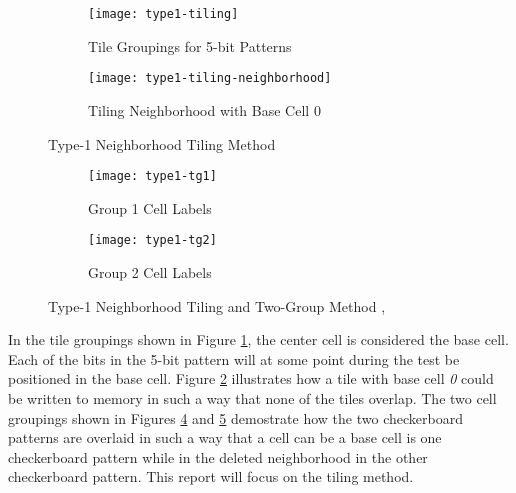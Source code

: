 \begin{figure}[H]
  \centering
  \begin{subfigure}[b]{0.4\textwidth}
    \texttt{[image: type1-tiling]}
    \caption{Tile Groupings for 5-bit Patterns}
    \label{fig:type1-tl}
  \end{subfigure}
  \begin{subfigure}[b]{0.4\textwidth}
    \texttt{[image: type1-tiling-neighborhood]}
    \caption{Tiling Neighborhood with Base Cell 0}
    \label{fig:type1-tlnh}
  \end{subfigure}
  \caption[Type-1 Neighborhood Tiling Method]{Type-1 Neighborhood Tiling Method \cite{VanDeGoor1991}}
  \label{fig:type1tiling}
\end{figure}

\begin{figure}[H]
  \centering
  \begin{subfigure}[b]{0.4\textwidth}
    \texttt{[image: type1-tg1]}
    \caption{Group 1 Cell Labels}
    \label{fig:type1-tg1}
  \end{subfigure}
  \begin{subfigure}[b]{0.4\textwidth}
    \texttt{[image: type1-tg2]}
    \caption{Group 2 Cell Labels}
    \label{fig:type1-tg2}
  \end{subfigure}
  \caption[Type-1 Neighborhood Tiling and Two-Group Method]{Type-1 Neighborhood Tiling and Two-Group Method \cite{1675601},\cite{1676572}}
  \label{fig:type1group}
\end{figure}

In the tile groupings shown in Figure \ref{fig:type1-tl}, the center cell is considered the base cell.  Each of the bits in the 5-bit pattern will at some point during the test be positioned in the base cell.  Figure \ref{fig:type1-tlnh} illustrates how a tile with base cell \textit{0} could be written to memory in such a way that none of the tiles overlap.  The two cell groupings shown in Figures \ref{fig:type1-tg1} and \ref{fig:type1-tg2} demostrate how the two checkerboard patterns are overlaid in such a way that a cell can be a base cell is one checkerboard pattern while in the deleted neighborhood in the other checkerboard pattern.  This report will focus on the tiling method.
